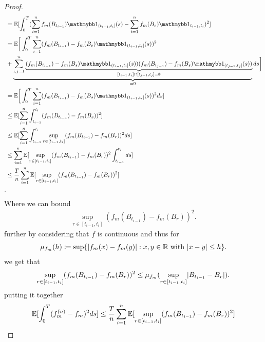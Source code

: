 \begin{proof}
\begin{align*}
                                          &= \E[\int_0^{T} (\sum_{i=1}^{n} f_m(B_{t_{i-1}})\cha_{(t_{i-1},t_i]}(s) - \sum_{i=1}^{n} f_m(B_s) \cha_{t_{{i-1}},t_i})^2 ] \\
                                          &= \E\bigg[\int_0^{T} \sum_{i=1}^{n} (f_m(B_{t_{i-1}})-f_{m}(B_s)\cha_{(t_{i-1},t_i]}(s))^2 \\
                                          &+ \underbrace{\sum_{i,j=1}^{n} \underbrace{(f_m(B_{t_{i-1}})-f_{m}(B_s)\cha_{(t_{i-1},t_i]}(s))(f_m(B_{t_{j-1}})-f_{m}(B_s)\cha_{(t_{j-1},t_j]}(s))}_{{[t_{i-1}},t_i] \cap [t_{j-1},t_{j}] = \emptyset }}_{=0}  ds \bigg] \\
                                          &= \E\bigg[\int_0^{T} \sum_{i=1}^{n} (f_m(B_{t_{i-1}})-f_{m}(B_s)\cha_{(t_{i-1},t_i]}(s))^2 ds] \\
                                          &\le   \E[\sum_{i=1}^{n} \int_{t_{i-1}}^{t_i} (f_m(B_{t_{i-1}}) - f_m(B_s))^2 ] \\
                                          &\le   \E[\sum_{i=1}^{n} \int_{t_{i-1}}^{t_i} \sup_{r \in [t_{i-1},t_{i}]}(f_m(B_{t_{i-1}})-f_m(B_r))^2 ds] \\
                                          &\le   \sum_{i=1}^{n} \E[\sup_{r \in [t_{i-1},t_{i}]}(f_m(B_{t_{i-1}})-f_m(B_r))^2 \int_{t_{i-1}}^{t_i}  ds] \\
                                          &\le    \frac{T}{n} \sum_{i=1}^{n} \E[\sup_{r \in [t_{i-1},t_{i}]}(f_m(B_{t_{i-1}})-f_m(B_r))^2 ] \\
.\end{align*}
Where we can bound 
\begin{align*}
  \sup_{r \in [t_{i-1},t_{i}]}(f_m(B_{t_{i-1}})-f_m(B_r))^2 
.\end{align*}
further by considering that $f$ is continuous and thus for 
\begin{align*}  
  \mu_{f_m}(h)\coloneqq  \sup \{\lvert f_m(x)-f_m(y)\rvert : x,y \in  \mathbb{R} \text{ with } \lvert x-y\rvert \le h \}
.\end{align*}
we get that
\begin{align*}
  \sup_{r \in [t_{i-1},t_{i}]}(f_m(B_{t_{i-1}})-f_m(B_r))^2  \le \mu_{f_m}(\sup_{r \in [t_{i-1},t_i]} \lvert B_{t_{i-1}}-B_r\rvert)  
.\end{align*}
putting it together
\begin{align*}
  \E[\int_0^{T}  (f_m^{(n)} - f_m )^2 ds] &\le    \frac{T}{n} \sum_{i=1}^{n} \E[\sup_{r \in [t_{i-1},t_{i}]}(f_m(B_{t_{i-1}})-f_m(B_r))^2 ] \\

\end{align*}
\end{proof}
